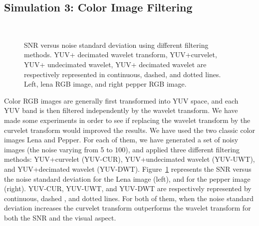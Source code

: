 \documentclass{article}
\begin{document}
\subsection{Simulation 3: Color Image Filtering}

\begin{figure}[htb]
\centerline{
\vbox{
\hbox{ 
}
}}
\caption{SNR versus noise standard deviation using different filtering methods.  YUV+ decimated wavelet transform,
YUV+curvelet, YUV+ undecimated wavelet, YUV+ decimated wavelet
are respectively represented in continuous, dashed, and dotted lines. 
Left, lena RGB image, and right pepper RGB image.}
\label{fig_exp_rgb_curv}
\end{figure}

Color RGB images are generally first transformed into YUV space,
and each YUV band is then filtered independently by the wavelet transform.
We have made some experiments in order to see if replacing the wavelet
transform by the curvelet transform would improved the results. We have used
the two classic color images Lena and Pepper. %
For each of them, we have generated a set of noisy images (the noise 
varying from 5 to 100), and applied three different filtering methods:
YUV+curvelet (YUV-CUR), YUV+undecimated wavelet (YUV-UWT), and
YUV+decimated wavelet (YUV-DWT).
Figure~\ref{fig_exp_rgb_curv} represents the SNR versus the noise 
standard deviation for the
Lena image (left), and  for the pepper image (right).
 YUV-CUR, YUV-UWT, and YUV-DWT are respectively represented by 
continuous, dashed , and dotted lines.  
For both of them, when the noise standard deviation increases 
the curvelet transform outperforms the wavelet transform for both the SNR and
the visual aspect.
\end{document}
